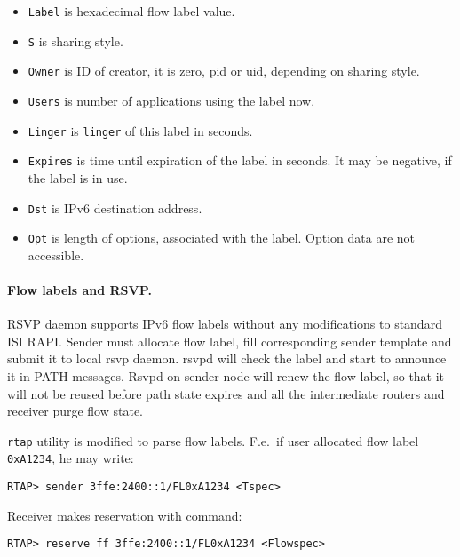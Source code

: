 \begin{itemize}
\item \verb|Label| is hexadecimal flow label value.
\item \verb|S| is sharing style.
\item \verb|Owner| is ID of creator, it is zero, pid or uid, depending on
		sharing style.
\item \verb|Users| is number of applications using the label now.
\item \verb|Linger| is \verb|linger| of this label in seconds.
\item \verb|Expires| is time until expiration of the label in seconds. It may
	be negative, if the label is in use.
\item \verb|Dst| is IPv6 destination address.
\item \verb|Opt| is length of options, associated with the label. Option
	data are not accessible.
\end{itemize}


\paragraph{Flow labels and RSVP.}
RSVP daemon supports IPv6 flow labels
without any modifications to standard ISI RAPI. Sender must allocate
flow label, fill corresponding sender template and submit it to local rsvp
daemon. rsvpd will check the label and start to announce it in PATH
messages. Rsvpd on sender node will renew the flow label, so that it will not
be reused before path state expires and all the intermediate
routers and receiver purge flow state.

\verb|rtap| utility is modified to parse flow labels. F.e.\ if user allocated
flow label \verb|0xA1234|, he may write:

\begin{verbatim}
RTAP> sender 3ffe:2400::1/FL0xA1234 <Tspec>
\end{verbatim}

Receiver makes reservation with command:
\begin{verbatim}
RTAP> reserve ff 3ffe:2400::1/FL0xA1234 <Flowspec>
\end{verbatim}


